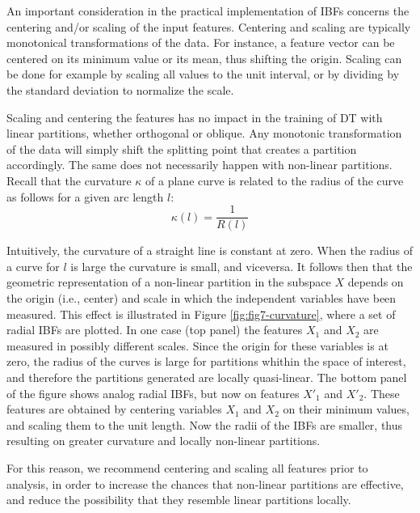 \documentclass[]{elsarticle} %
\begin{document}
An important consideration in the practical implementation of IBFs
concerns the centering and/or scaling of the input features. Centering
and scaling are typically monotonical transformations of the data. For
instance, a feature vector can be centered on its minimum value or its
mean, thus shifting the origin. Scaling can be done for example by
scaling all values to the unit interval, or by dividing by the standard
deviation to normalize the scale.

Scaling and centering the features has no impact in the training of DT
with linear partitions, whether orthogonal or oblique. Any monotonic
transformation of the data will simply shift the splitting point that
creates a partition accordingly. The same does not necessarily happen
with non-linear partitions. Recall that the curvature \(\kappa\) of a
plane curve is related to the radius of the curve as follows for a given
arc length \(l\): \[
\kappa(l)=\frac{1}{R(l)}
\]

Intuitively, the curvature of a straight line is constant at zero. When
the radius of a curve for \(l\) is large the curvature is small, and
viceversa. It follows then that the geometric representation of a
non-linear partition in the subspace \(X\) depends on the origin (i.e.,
center) and scale in which the independent variables have been measured.
This effect is illustrated in Figure \ref{fig:fig7-curvature}, where a
set of radial IBFs are plotted. In one case (top panel) the features
\(X_1\) and \(X_2\) are measured in possibly different scales. Since the
origin for these variables is at zero, the radius of the curves is large
for partitions whithin the space of interest, and therefore the
partitions generated are locally quasi-linear. The bottom panel of the
figure shows analog radial IBFs, but now on features \(X'_1\) and
\(X'_2\). These features are obtained by centering variables \(X_1\) and
\(X_2\) on their minimum values, and scaling them to the unit length.
Now the radii of the IBFs are smaller, thus resulting on greater
curvature and locally non-linear partitions.

For this reason, we recommend centering and scaling all features prior
to analysis, in order to increase the chances that non-linear partitions
are effective, and reduce the possibility that they resemble linear
partitions locally.
\end{document}
